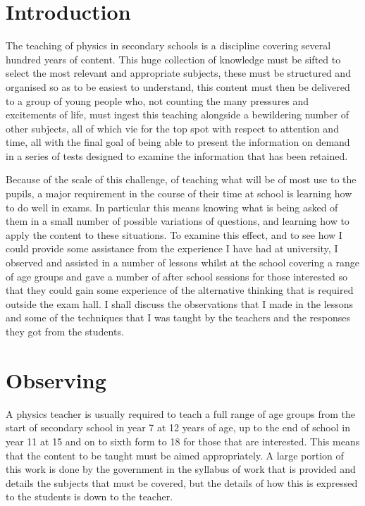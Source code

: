 
\section{Introduction} %
\label{sec:introduction}
	The teaching of physics in secondary schools is a discipline covering several hundred years of content. This huge collection of knowledge must be sifted to select the most relevant and appropriate subjects, these must be structured and organised so as to be easiest to understand, this content must then be delivered to a group of young people who, not counting the many pressures and excitements of life, must ingest this teaching alongside a bewildering number of other subjects, all of which vie for the top spot with respect to attention and time, all with the final goal of being able to present the information on demand in a series of tests designed to examine the information that has been retained.

	Because of the scale of this challenge, of teaching what will be of most use to the pupils, a major requirement in the course of their time at school is learning how to do well in exams. In particular this means knowing what is being asked of them in a small number of possible variations of questions, and learning how to apply the content to these situations. To examine this effect, and to see how I could provide some assistance from the experience I have had at university, I observed and assisted in a number of lessons whilst at the school covering a range of age groups and gave a number of after school sessions for those interested so that they could gain some experience of the alternative thinking that is required outside the exam hall. I shall discuss the observations that I made in the lessons and some of the techniques that I was taught by the teachers and the responses they got from the students.

\section{Observing} %
\label{sec:observing}
	A physics teacher is usually required to teach a full range of age groups from the start of secondary school in year 7 at 12 years of age, up to the end of school in year 11 at 15 and on to sixth form to 18 for those that are interested. This means that the content to be taught must be aimed appropriately. A large portion of this work is done by the government in the syllabus of work that is provided and details the subjects that must be covered, but the details of how this is expressed to the students is down to the teacher.


